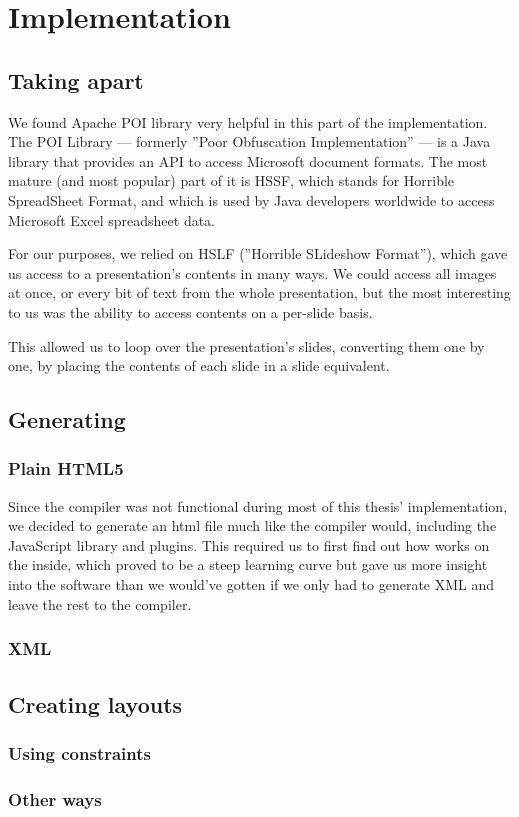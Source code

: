 
 \chapter{Implementation}

  \section{Taking \ppt apart}

   We found Apache POI library very helpful in this part of the implementation.
   The POI Library --- formerly ''Poor Obfuscation Implementation''
   \citep{sundaram-1} --- is a Java library that provides an API to access
   Microsoft document formats. The most mature (and most popular) part of it is
   HSSF, which stands for Horrible SpreadSheet Format, and which is used by
   Java developers worldwide to access Microsoft Excel spreadsheet data. 

   For our purposes, we relied on HSLF (''Horrible SLideshow Format''), which
   gave us access to a \ppt presentation's contents in many ways. We could
   access all images at once, or every bit of text from the whole presentation,
   but the most interesting to us was the ability to access contents on a
   per-slide basis.

   This allowed us to loop over the presentation's slides, converting them one
   by one, by placing the contents of each slide in a \mxp slide equivalent.

  \section{Generating \mxp}

   \subsection{Plain HTML5}

    Since the \mxp compiler was not functional during most of this thesis'
    implementation, we decided to generate an html file much like the \mxp
    compiler would, including the \mxp JavaScript library and plugins. This
    required us to first find out how \mxp works on the inside, which proved to
    be a steep learning curve but gave us more insight into the software than
    we would've gotten if we only had to generate \mxp XML and leave the rest
    to the compiler.

   \subsection{\mxp XML}

  \section{Creating layouts}

   \subsection{Using constraints}

   \subsection{Other ways}

